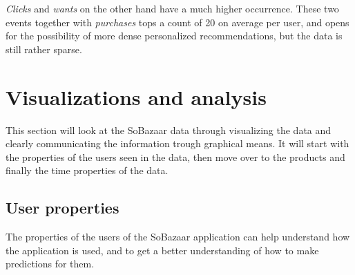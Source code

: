     \emph{Clicks} and \emph{wants} on the other hand have a much higher occurrence. These two events together with \emph{purchases} tops a count of 20 on average per user, and opens for the possibility of more dense personalized recommendations, but the data is still rather sparse.

\section{Visualizations and analysis}
    This section will look at the SoBazaar data through visualizing the data and clearly communicating the information trough graphical means.
    It will start with the properties of the users seen in the data, then move over to the products and finally the time properties of the data.

\subsection{User properties}
    The properties of the users of the SoBazaar application can help understand how the application is used, and to get a better understanding of how to make predictions for them.

